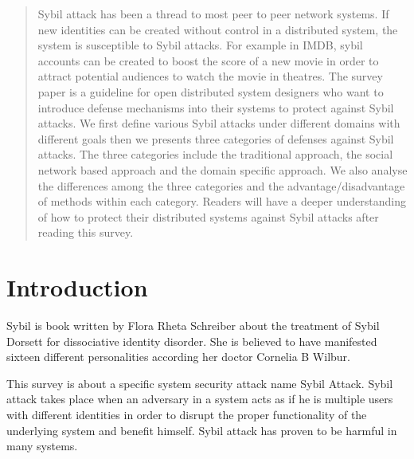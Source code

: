 \documentclass[conference]{IEEEtran}
\begin{document}
\begin{abstract}
Sybil attack has been a thread to most peer to peer network systems. 
If new identities can be created without control in a distributed system, the system is susceptible to Sybil attacks.
For example in IMDB, sybil accounts can be created to boost the score of a new movie in order to attract potential audiences to watch the movie in theatres.
The survey paper is a guideline for open distributed system designers who want to introduce defense mechanisms into their systems to protect against Sybil attacks.
We first define various Sybil attacks under different domains with different goals then we presents three categories of defenses against Sybil attacks.
The three categories include the traditional approach, the social network based approach and the domain specific approach.
We also analyse the differences among the three categories and the advantage/disadvantage of methods within each category. 
Readers will have a deeper understanding of how to protect their distributed systems against Sybil attacks after reading this survey.

\end{abstract}





%
\IEEEpeerreviewmaketitle



\section{Introduction}

Sybil is book written by Flora Rheta Schreiber about the treatment of Sybil Dorsett for dissociative identity disorder. She is believed to have manifested sixteen different
personalities according her doctor Cornelia B Wilbur.\cite{sybil16wiki}

This survey is about a specific system security attack name Sybil Attack. Sybil attack takes place when an adversary in a system acts as if he is multiple users
with different identities in order to disrupt the proper functionality of the underlying system and benefit himself. Sybil attack has proven to be harmful in many systems. 
\end{document}
